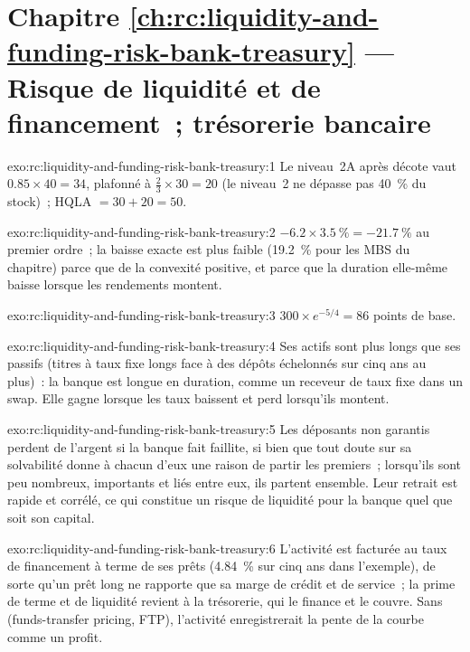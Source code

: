 \section*{Chapitre \ref{ch:rc:liquidity-and-funding-risk-bank-treasury} --- Risque de liquidité et de financement~; trésorerie bancaire}

\begin{solution}{exo:rc:liquidity-and-funding-risk-bank-treasury:1}
Le niveau~2A après décote vaut $0.85\times40 = 34$, plafonné à $\tfrac23\times30 = 20$ (le niveau~2 ne dépasse pas 40~\% du
stock)~; HQLA $= 30+20 = 50$.
\end{solution}

\begin{solution}{exo:rc:liquidity-and-funding-risk-bank-treasury:2}
$-6.2\times3.5~\% = -21.7~\%$ au premier ordre~; la baisse exacte est plus faible (19.2~\% pour les MBS du chapitre) parce que
de la convexité positive, et parce que la duration elle-même baisse lorsque les rendements montent.
\end{solution}

\begin{solution}{exo:rc:liquidity-and-funding-risk-bank-treasury:3}
$300\times e^{-5/4} = 86$ points de base.
\end{solution}

\begin{solution}{exo:rc:liquidity-and-funding-risk-bank-treasury:4}
Ses actifs sont plus longs que ses passifs (titres à taux fixe longs face à des dépôts échelonnés
sur cinq ans au plus)~: la banque est longue en duration, comme un receveur de taux fixe dans un swap. Elle gagne lorsque les taux baissent
et perd lorsqu'ils montent.
\end{solution}

\begin{solution}{exo:rc:liquidity-and-funding-risk-bank-treasury:5}
Les déposants non garantis perdent de l'argent si la banque fait faillite, si bien que tout doute sur sa solvabilité donne à chacun d'eux une
raison de partir les premiers~; lorsqu'ils sont peu nombreux, importants et liés entre eux, ils partent ensemble. Leur retrait est
rapide et corrélé, ce qui constitue un risque de liquidité pour la banque quel que soit son capital.
\end{solution}

\begin{solution}{exo:rc:liquidity-and-funding-risk-bank-treasury:6}
L'activité est facturée au taux de financement à terme de ses prêts (4.84~\% sur cinq ans dans l'exemple), de
sorte qu'un prêt long ne rapporte que sa marge de crédit et de service~; la prime de terme et de liquidité revient à la trésorerie,
qui le finance et le couvre. Sans  (funds-transfer pricing, FTP), l'activité enregistrerait la pente de la courbe comme un profit.
\end{solution}

